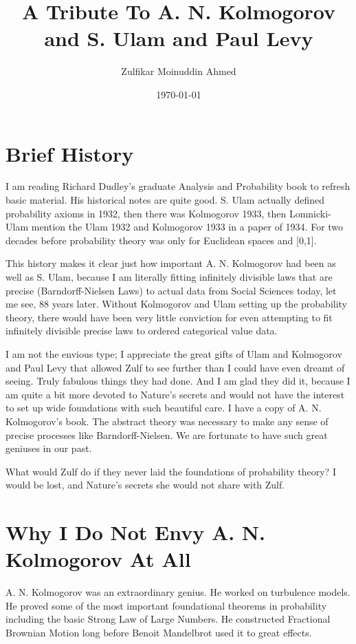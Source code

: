 \documentclass{amsart}
\title{A Tribute To A. N. Kolmogorov and S. Ulam and Paul Levy}
\author{Zulfikar Moinuddin Ahmed}
\date{\today}
\begin{document}
\maketitle

\section{Brief History}

I am reading Richard Dudley's graduate Analysis and Probability book to refresh basic material.  His historical notes are quite good.  S. Ulam actually defined probability axioms in 1932, then there was Kolmogorov 1933, then Lomnicki-Ulam mention the Ulam 1932 and Kolmogorov 1933 in a paper of 1934.  For two decades before probability theory was only for Euclidean spaces and [0,1].

This history makes it clear just how important A. N. Kolmogorov had been as well as S. Ulam, because I am literally fitting infinitely divisible laws that are precise (Barndorff-Nielsen Laws) to actual data from Social Sciences today, let me see, 88 years later.  Without Kolmogorov and Ulam setting up the probability theory, there would have been very little conviction for even attempting to fit infinitely divisible precise laws to ordered categorical value data.  

I am not the envious type; I appreciate the great gifts of Ulam and Kolmogorov and Paul Levy that allowed Zulf to see further than I could have even dreamt of seeing.  Truly fabulous things they had done.  And I am glad they did it, because I am quite a bit more devoted to Nature's secrets and would not have the interest to set up wide foundations with such beautiful care.  I have a copy of A. N. Kolmogorov's book.  The abstract theory was necessary to make any sense of precise processes like Barndorff-Nielsen.  We are fortunate to have such great geniuses in our past.  

What would Zulf do if they never laid the foundations of probability theory?  I would be lost, and Nature's secrets she would not share with Zulf.

\section{Why I Do Not Envy A. N. Kolmogorov At All}

A. N. Kolmogorov was an extraordinary genius.  He worked on turbulence models.  He proved some of the most important foundational theorems in probability including the basic Strong Law of Large Numbers.  He constructed Fractional Brownian Motion long before Benoit Mandelbrot used it to great effects.  
\end{document}
